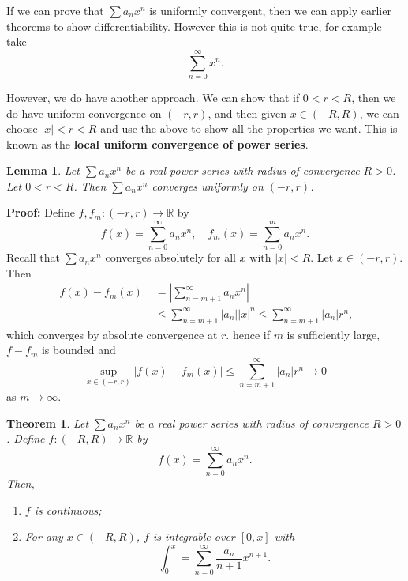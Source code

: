 \documentclass[12pt]{article}
\newtheorem{theorem}{Theorem}[section]
\newtheorem{lemma}{Lemma}[section]
\theoremstyle{definition}
\theoremstyle{remark}
\begin{document}
If we can prove that $\sum a_n x^{n}$ is uniformly convergent, then we can apply earlier theorems to show differentiability. However this is not quite true, for example take
\[
\sum_{n = 0}^{\infty} x^{n}
.\]

However, we do have another approach. We can show that if $0 < r < R$, then we do have uniform convergence on $(-r, r)$, and then given $x \in (-R, R)$, we can choose $|x| < r < R$ and use the above to show all the properties we want. This is known as the \textbf{local uniform convergence of power series}.

\begin{lemma} 
	Let $\sum a_n x^{n}$ be a real power series with radius of convergence $R > 0$. Let $0 < r < R$. Then $\sum a_n x^{n}$ converges uniformly on $(-r, r)$.
\end{lemma}

\begin{adjustbox}{minipage = \columnwidth - 25.5pt, margin=1em, frame=1pt, margin=0em}
	\textbf{Proof:} Define $f, f_m : (-r, r) \to \mathbb{R}$ by
	\[
		f(x) = \sum_{n = 0}^{\infty} a_n x^{n}, \quad f_m(x) = \sum_{n = 0}^{m} a_n x^{n}
	.\]
	Recall that $\sum a_n x^{n}$ converges absolutely for all $x$ with $|x| < R$. Let $x \in (-r, r)$. Then
	\begin{align*}
		|f(x) - f_m(x)| &= \left| \sum_{n = m + 1}^{\infty} a_n x^{n} \right| \\
				&\leq \sum_{n = m+1}^{\infty}|a_n||x|^{n} \leq \sum_{n = m + 1}^{\infty}|a_n|r^{n},
	\end{align*}
	which converges by absolute convergence at $r$. hence if $m$ is sufficiently large, $f - f_m$ is bounded and
	\[
		\sup_{x \in (-r, r)}|f(x) - f_m(x)| \leq \sum_{n = m+1}^{\infty} |a_n|r^{n} \to 0
	\]
	as $m \to \infty$.
\end{adjustbox}

\begin{theorem}
	Let $\sum a_n x^{n}$ be a real power series with radius of convergence $R > 0$. Define $f : (-R, R) \to \mathbb{R}$ by
	 \[
		 f(x) = \sum_{n = 0}^{\infty} a_n x^{n}
	.\]
	Then,
	\begin{enumerate}[\normalfont(i)]
		\item $f$ is continuous;
		\item For any $x \in (-R, R)$, $f$ is integrable over $[0, x]$ with
			\[
			\int_{0}^{x} = \sum_{n= 0}^{\infty}\frac{a_n}{n+1}x^{n+1}
			.\]
	\end{enumerate}
\end{theorem}
\end{document}
